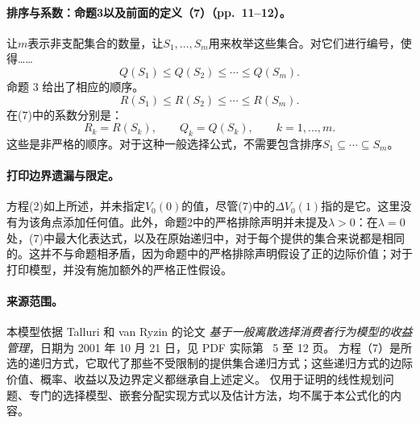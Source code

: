 \documentclass{article}
\begin{document}
\paragraph{排序与系数：命题3以及前面的定义（7）（pp.~11--12）。}
让$m$表示非支配集合的数量，让$S_1,\ldots,S_m$用来枚举这些集合。对它们进行编号，使得……
\[
Q(S_1)\le Q(S_2)\le\cdots\le Q(S_m).
\]
命题 3 给出了相应的顺序。
\[
R(S_1)\le R(S_2)\le\cdots\le R(S_m).
\]
在(7)中的系数分别是：
\[
R_k=R(S_k),\qquad Q_k=Q(S_k),\qquad k=1,\ldots,m.
\]
这些是非严格的顺序。对于这种一般选择公式，不需要包含排序$S_1\subseteq\cdots\subseteq S_m$。

\paragraph{打印边界遗漏与限定。}
方程(2)如上所述，并未指定$V_0(0)$的值，尽管(7)中的$\Delta V_0(1)$指的是它。这里没有为该角点添加任何值。此外，命题2中的严格排除声明并未提及$\lambda>0$：在$\lambda=0$处，(7)中最大化表达式，以及在原始递归中，对于每个提供的集合来说都是相同的。这并不与命题相矛盾，因为命题中的严格排除声明假设了正的边际价值；对于打印模型，并没有施加额外的严格正性假设。

\paragraph{来源范围。}
本模型依据 Talluri 和 van Ryzin 的论文 \emph{基于一般离散选择消费者行为模型的收益管理}，日期为 2001 年 10 月 21 日，见 PDF 实际第 ~5 至 12 页。 方程（7）是所选的递归方式，它取代了那些不受限制的提供集合递归方式；这些递归方式的边际价值、概率、收益以及边界定义都继承自上述定义。 仅用于证明的线性规划问题、专门的选择模型、嵌套分配实现方式以及估计方法，均不属于本公式化的内容。
\end{document}
